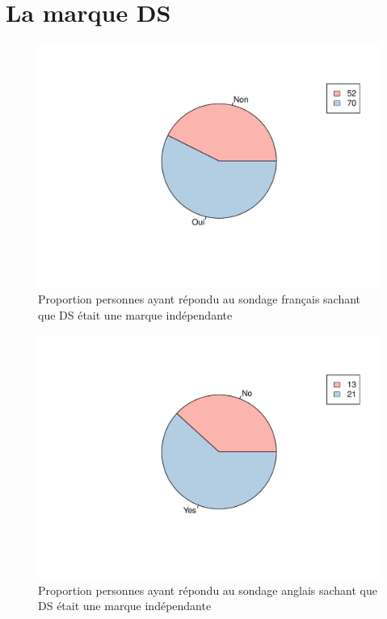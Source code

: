 \documentclass[12pt]{article}\usepackage[]{graphicx}\usepackage[]{color}
\makeatletter
\def\maxwidth{ %
  \ifdim\Gin@nat@width>\linewidth
    \linewidth
  \else
    \Gin@nat@width
  \fi
}
\newenvironment{knitrout}{}{} %
\makeatother
\begin{document}
\section{La marque DS}

\begin{knitrout}
\color{fgcolor}\begin{figure}[H]
\includegraphics[width=\maxwidth]{figure/ds_know_fr-1} \caption[Proportion personnes ayant répondu au sondage français sachant que DS était une marque indépendante]{Proportion personnes ayant répondu au sondage français sachant que DS était une marque indépendante}\label{fig:ds know fr}
\end{figure}


\end{knitrout}

\begin{knitrout}
\color{fgcolor}\begin{figure}[H]
\includegraphics[width=\maxwidth]{figure/ds_know_en-1} \caption[Proportion personnes ayant répondu au sondage anglais sachant que DS était une marque indépendante]{Proportion personnes ayant répondu au sondage anglais sachant que DS était une marque indépendante}\label{fig:ds know en}
\end{figure}


\end{knitrout}
\end{document}

